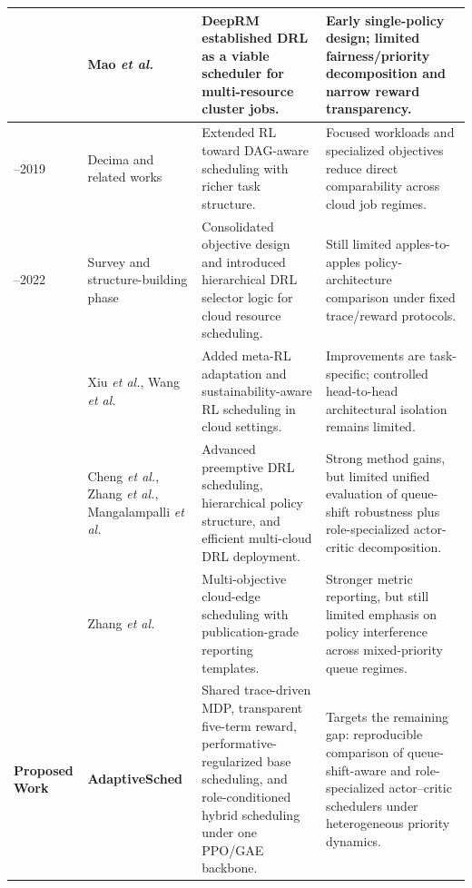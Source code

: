 \documentclass[journal]{IEEEtran}
\begin{document}
\begin{table}[ht]
\begin{tabular}{|>{\centering\arraybackslash}m{2.0cm}|>{\raggedright\arraybackslash}m{3.0cm}|>{\raggedright\arraybackslash}m{6cm}|>{\raggedright\arraybackslash}m{5.6cm}|}
2016 & Mao \textit{et al.}~\cite{mao2016resource} & DeepRM established DRL as a viable scheduler for multi-resource cluster jobs. & Early single-policy design; limited fairness/priority decomposition and narrow reward transparency. \\ \hline
2017--2019 & Decima and related works~\cite{decima2019} & Extended RL toward DAG-aware scheduling with richer task structure. & Focused workloads and specialized objectives reduce direct comparability across cloud job regimes. \\ \hline
2020--2022 & Survey and structure-building phase~\cite{arunarani2019survey, zhou2022selector, zhou2024aireview} & Consolidated objective design and introduced hierarchical DRL selector logic for cloud resource scheduling. & Still limited apples-to-apples policy-architecture comparison under fixed trace/reward protocols. \\ \hline
2023 & Xiu \textit{et al.}, Wang \textit{et al.}~\cite{xiu2023mrlcc, wang2023erlfc} & Added meta-RL adaptation and sustainability-aware RL scheduling in cloud settings. & Improvements are task-specific; controlled head-to-head architectural isolation remains limited. \\ \hline
2024 & Cheng \textit{et al.}, Zhang \textit{et al.}, Mangalampalli \textit{et al.}~\cite{cheng2024preemptive, zhang2024hdrl, mangalampalli2024efficient} & Advanced preemptive DRL scheduling, hierarchical policy structure, and efficient multi-cloud DRL deployment. & Strong method gains, but limited unified evaluation of queue-shift robustness plus role-specialized actor-critic decomposition. \\ \hline
2025 & Zhang \textit{et al.}~\cite{zhang2025s41598} & Multi-objective cloud-edge scheduling with publication-grade reporting templates. & Stronger metric reporting, but still limited emphasis on policy interference across mixed-priority queue regimes. \\ \hline
\textbf{Proposed Work} & \textbf{AdaptiveSched} & Shared trace-driven MDP, transparent five-term reward, performative-regularized base scheduling, and role-conditioned hybrid scheduling under one PPO/GAE backbone. & Targets the remaining gap: reproducible comparison of queue-shift-aware and role-specialized actor--critic schedulers under heterogeneous priority dynamics. \\ \hline
\end{tabular}
\end{table}
\end{document}
